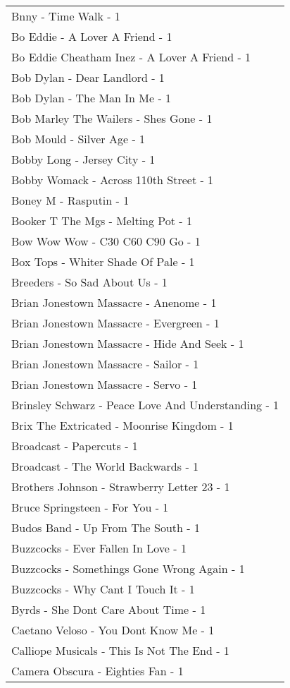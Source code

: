 \documentclass[
]{article}
\begin{document}
\begin{longtable}{l}
Bnny - Time Walk - 1 \\ 
Bo Eddie - A Lover A Friend - 1 \\ 
Bo Eddie Cheatham Inez - A Lover A Friend - 1 \\ 
Bob Dylan - Dear Landlord - 1 \\ 
Bob Dylan - The Man In Me - 1 \\ 
Bob Marley The Wailers - Shes Gone - 1 \\ 
Bob Mould - Silver Age - 1 \\ 
Bobby Long - Jersey City - 1 \\ 
Bobby Womack - Across 110th Street - 1 \\ 
Boney M - Rasputin - 1 \\ 
Booker T The Mgs - Melting Pot - 1 \\ 
Bow Wow Wow - C30 C60 C90 Go - 1 \\ 
Box Tops - Whiter Shade Of Pale - 1 \\ 
Breeders - So Sad About Us - 1 \\ 
Brian Jonestown Massacre - Anenome - 1 \\ 
Brian Jonestown Massacre - Evergreen - 1 \\ 
Brian Jonestown Massacre - Hide And Seek - 1 \\ 
Brian Jonestown Massacre - Sailor - 1 \\ 
Brian Jonestown Massacre - Servo - 1 \\ 
Brinsley Schwarz - Peace Love And Understanding - 1 \\ 
Brix The Extricated - Moonrise Kingdom - 1 \\ 
Broadcast - Papercuts - 1 \\ 
Broadcast - The World Backwards - 1 \\ 
Brothers Johnson - Strawberry Letter 23 - 1 \\ 
Bruce Springsteen - For You - 1 \\ 
Budos Band - Up From The South - 1 \\ 
Buzzcocks - Ever Fallen In Love - 1 \\ 
Buzzcocks - Somethings Gone Wrong Again - 1 \\ 
Buzzcocks - Why Cant I Touch It - 1 \\ 
Byrds - She Dont Care About Time - 1 \\ 
Caetano Veloso - You Dont Know Me - 1 \\ 
Calliope Musicals - This Is Not The End - 1 \\ 
Camera Obscura - Eighties Fan - 1 \\ 

\end{longtable}
\end{document}

